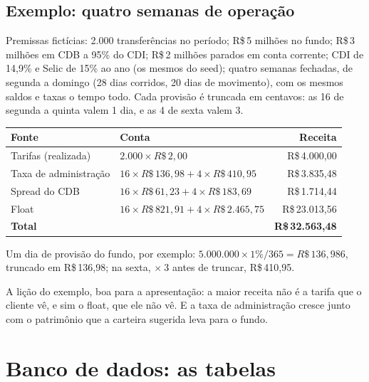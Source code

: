 \documentclass[11pt,a4paper]{article}
\newcommand{\rs}{R\$\,}
\begin{document}
\subsection{Exemplo: quatro semanas de operação}

Premissas fictícias: 2.000 transferências no período; \rs 5 milhões no fundo; \rs 3 milhões em CDB
a 95\% do CDI; \rs 2 milhões parados em conta corrente; CDI de 14,9\% e Selic de 15\% ao ano
(os mesmos do seed); quatro semanas fechadas, de segunda a domingo (28 dias corridos, 20 dias de
movimento), com os mesmos saldos e taxas o tempo todo. Cada provisão é truncada em centavos: as 16 de
segunda a quinta valem 1 dia, e as 4 de sexta valem 3.

\begin{center}
\begin{tabular}{@{}llr@{}}
\toprule
\textbf{Fonte} & \textbf{Conta} & \textbf{Receita} \\
\midrule
Tarifas (realizada) & $2.000 \times \rs 2{,}00$ & \rs 4.000,00 \\
Taxa de administração & $16 \times \rs 136{,}98 + 4 \times \rs 410{,}95$ & \rs 3.835,48 \\
Spread do CDB & $16 \times \rs 61{,}23 + 4 \times \rs 183{,}69$ & \rs 1.714,44 \\
Float & $16 \times \rs 821{,}91 + 4 \times \rs 2.465{,}75$ & \rs 23.013,56 \\
\midrule
\textbf{Total} & & \textbf{\rs 32.563,48} \\
\bottomrule
\end{tabular}
\end{center}

Um dia de provisão do fundo, por exemplo: $5.000.000 \times 1\% / 365 = \rs 136{,}986$, truncado em
\rs 136,98; na sexta, $\times\ 3$ antes de truncar, \rs 410,95.

A lição do exemplo, boa para a apresentação: a maior receita não é a tarifa que o cliente vê, e sim
o float, que ele não vê. E a taxa de administração cresce junto com o patrimônio que a carteira
sugerida leva para o fundo.

\section{Banco de dados: as tabelas}
\end{document}
